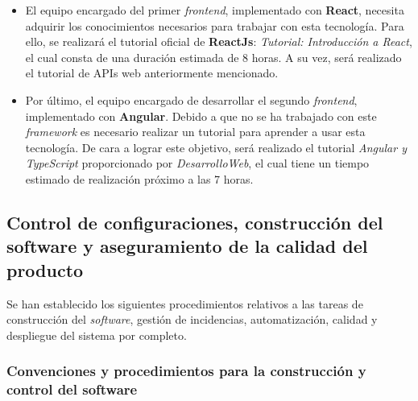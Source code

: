\documentclass[11pt, a4paper, titlepage]{article}
\begin{document}
\begin{itemize}
\item El equipo encargado del primer \textit{frontend}, implementado con \textbf{React}, necesita adquirir los conocimientos necesarios para trabajar con esta tecnología. Para ello, se realizará el tutorial oficial de \textbf{ReactJs}: \textit{Tutorial: Introducción a React}\textsuperscript{\cite{reactjs}}, el cual consta de una duración estimada de 8 horas. A su vez, será realizado el tutorial de APIs web anteriormente mencionado\textsuperscript{\cite{apisweb}}.

\item Por último, el equipo encargado de desarrollar el segundo \textit{frontend}, implementado con \textbf{Angular}. Debido a que no se ha trabajado con este \textit{framework} es necesario realizar un tutorial para aprender a usar esta tecnología. De cara a lograr este objetivo, será realizado el tutorial \textit{Angular y TypeScript}\textsuperscript{\cite{angular}} proporcionado por \textit{DesarrolloWeb}, el cual tiene un tiempo estimado de realización próximo a las 7 horas.

\end{itemize}

\subsection{Control de configuraciones, construcción del software y aseguramiento de la calidad del producto}

Se han establecido los siguientes procedimientos relativos a las tareas de construcción del \textit{software}, gestión de incidencias, automatización, calidad y despliegue del sistema por completo.

\subsubsection{Convenciones y procedimientos para la construcción y control del software}
\end{document}
